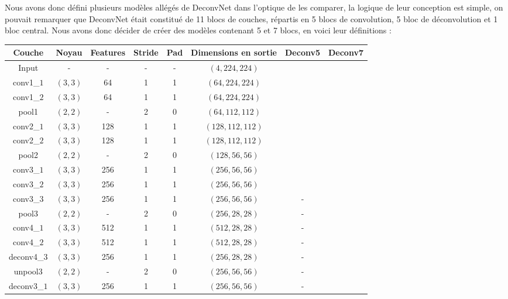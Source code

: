 \documentclass[a4paper, 11pt]{report}
\begin{document}
Nous avons donc défini plusieurs modèles allégés de DeconvNet dans l'optique de les comparer, la logique de leur conception est simple, on pouvait remarquer que DeconvNet était constitué de 11 blocs de couches, répartis en 5 blocs de convolution, 5 bloc de déconvolution et 1 bloc central.
Nous avons donc décider de créer des modèles contenant 5 et 7 blocs, en voici leur définitions :
\begin{center}
	\begin{tabular}{|c|c|c|c|c|c|c|c|}
	\hline 
	Couche & Noyau & Features & Stride & Pad & Dimensions en sortie & Deconv5 & Deconv7\\ 
	\hline 
	Input & - & - & - & - & $(4, 224, 224)$ & \checkmark & \checkmark \\ 
	\hline 
	conv1\_$1$ & $(3, 3)$ & 64 & 1 & 1 & $(64, 224, 224)$ & \checkmark & \checkmark \\
	\hline 
	conv1\_$2$ & $(3, 3)$ & 64 & 1 & 1 & $(64, 224, 224)$ & \checkmark & \checkmark \\
	\hline 
	pool1 & $(2, 2)$ & - & 2 & 0 & $(64, 112, 112)$ & \checkmark & \checkmark \\
	\hline 
	conv2\_$1$ & $(3, 3)$ & 128 & 1 & 1 & $(128, 112, 112)$ & \checkmark & \checkmark \\
	\hline 
	conv2\_$2$ & $(3, 3)$ & 128 & 1 & 1 & $(128, 112, 112)$ & \checkmark & \checkmark \\
	\hline 
	pool2 & $(2, 2)$ & - & 2 & 0 & $(128, 56, 56)$ & \checkmark & \checkmark \\
	\hline 
	conv3\_$1$ & $(3, 3)$ & 256 & 1 & 1 & $(256, 56, 56)$ & \checkmark & \checkmark \\
	\hline 
	conv3\_$2$ & $(3, 3)$ & 256 & 1 & 1 & $(256, 56, 56)$ & \checkmark & \checkmark \\
	\hline 
	conv3\_$3$ & $(3, 3)$ & 256 & 1 & 1 & $(256, 56, 56)$ & - & \checkmark \\
	\hline 
	pool3 & $(2, 2)$ & - & 2 & 0 & $(256, 28, 28)$ & - & \checkmark \\
	\hline 
	conv4\_$1$ & $(3, 3)$ & 512 & 1 & 1 & $(512, 28, 28)$ & - & \checkmark \\
	\hline 
	conv4\_$2$ & $(3, 3)$ & 512 & 1 & 1 & $(512, 28, 28)$ & - & \checkmark \\
	\hline
	deconv4\_$3$ & $(3, 3)$ & 256 & 1 & 1 & $(256, 28, 28)$ & - & \checkmark \\
	\hline
	unpool3 & $(2, 2)$ & - & 2 & 0 & $(256, 56, 56)$ & - & \checkmark \\
	\hline
	deconv3\_$1$ & $(3, 3)$ & 256 & 1 & 1 & $(256, 56, 56)$ & - & \checkmark \\

\end{tabular}
\end{center}
\end{document}
